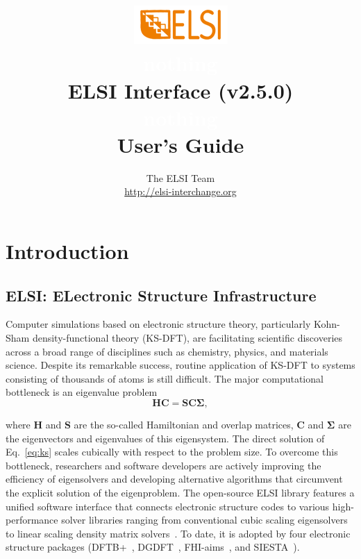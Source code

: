 \documentclass{report}
\newcommand{\tcw}[1]{\textcolor{white}{#1}}
\begin{document}
\title{\includegraphics[scale=0.07]{elsi_logo.png}\\ \tcw{nothing}\\ \textbf{ELSI Interface (v2.5.0)\\ \tcw{nothing}\\ User's Guide}}
\author{The ELSI Team\\ \url{http://elsi-interchange.org}}
\maketitle

\tableofcontents

\chapter{Introduction}
\section{ELSI: ELectronic Structure Infrastructure}
\label{sec:elsi}
Computer simulations based on electronic structure theory, particularly Kohn-Sham density-functional theory (KS-DFT), are facilitating scientific discoveries across a broad range of disciplines such as chemistry, physics, and materials science. Despite its remarkable success, routine application of KS-DFT to systems consisting of thousands of atoms is still difficult. The major computational bottleneck is an eigenvalue problem
\begin{equation}
\label{eq:ks}
\boldsymbol{H} \boldsymbol{C} = \boldsymbol{S} \boldsymbol{C} \boldsymbol{\Sigma},
\end{equation}

where $\boldsymbol{H}$ and $\boldsymbol{S}$ are the so-called Hamiltonian and overlap matrices, $\boldsymbol{C}$ and $\boldsymbol{\Sigma}$ are the eigenvectors and eigenvalues of this eigensystem. The direct solution of Eq.~\ref{eq:ks} scales cubically with respect to the problem size. To overcome this bottleneck, researchers and software developers are actively improving the efficiency of eigensolvers and developing alternative algorithms that circumvent the explicit solution of the eigenproblem. The open-source ELSI library features a unified software interface that connects electronic structure codes to various high-performance solver libraries ranging from conventional cubic scaling eigensolvers to linear scaling density matrix solvers~\cite{elsi_yu_2018}. To date, it is adopted by four electronic structure packages (DFTB+~\cite{dftb_aradi_2007}, DGDFT~\cite{dgdft_hu_2015}, FHI-aims~\cite{fhiaims_blum_2009}, and SIESTA~\cite{siesta_soler_2002}).
\end{document}
